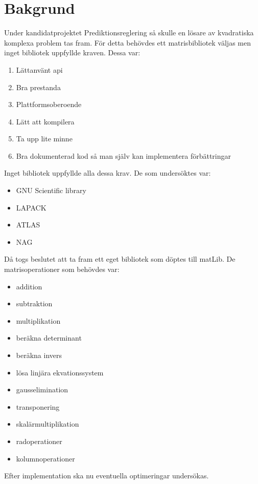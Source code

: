 \section{Bakgrund}
Under kandidatprojektet Prediktionsreglering så skulle en lösare av kvadratiska komplexa problem tas fram. För detta behövdes ett matrisbibliotek väljas men inget bibliotek uppfyllde kraven. Dessa var:
\begin{enumerate}

\item Lättanvänt api
\item Bra prestanda
\item Plattformsoberoende
\item Lätt att kompilera
\item Ta upp lite minne
\item Bra dokumenterad kod så man själv kan implementera förbättringar

\end{enumerate} 

Inget bibliotek uppfyllde alla dessa krav. De som undersöktes var:
\begin{itemize}

\item GNU Scientific library
\item LAPACK
\item ATLAS
\item NAG

\end{itemize}
Då togs beslutet att ta fram ett eget bibliotek som döptes till matLib. De matrisoperationer som behövdes var:
\begin{itemize}

\item addition
\item subtraktion
\item multiplikation
\item beräkna determinant
\item beräkna invers
\item lösa linjära ekvationssystem
\item gausselimination
\item transponering
\item skalärmultiplikation
\item radoperationer
\item kolumnoperationer

\end{itemize}
Efter implementation ska nu eventuella optimeringar undersökas. 

